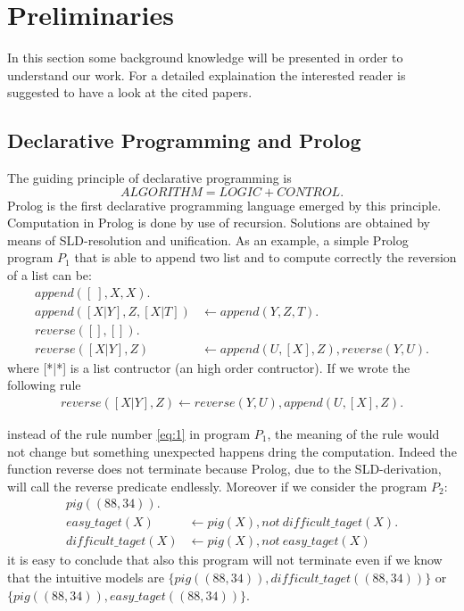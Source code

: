 \usepackage{graphicx}
\section{Preliminaries}
In this section some background knowledge will be presented in order to understand our work. For a detailed explaination the interested reader is suggested to have a look at the cited papers. 
\subsection{Declarative Programming and Prolog}
The guiding principle of declarative programming is 
\[ALGORITHM = LOGIC + CONTROL.\]
Prolog is the first declarative programming language emerged by this principle. Computation in Prolog is done by use of recursion. Solutions are obtained by means of SLD-resolution and unification. As an example, a simple Prolog program \(P_1\) that  is able to append two list and to compute correctly the reversion of a list can be: 
\begin{align}
append ([\:], X, X).& \\
append ([X|Y], Z, [X|T ]) &\leftarrow append (Y, Z, T ). \\
reverse([ ], [ ]).&\\
reverse([X|Y ], Z) &\leftarrow append (U, [X], Z), reverse(Y, U ). \label{eq:1}
\end{align}
where [*|*] is a list contructor (an high order contructor).
If we wrote the following rule 
\begin{align}
reverse([X|Y ], Z) \leftarrow reverse(Y, U ), append(U, [X], Z). \label{eq:2}
\end{align}

instead of the rule number \ref{eq:1} in program \(P_1\), the meaning of the rule would not change but something unexpected happens dring the computation. Indeed the function reverse does not terminate because Prolog, due to the SLD-derivation, will call the reverse predicate endlessly. Moreover if we consider the program  \(P_2\):
\begin{align}
pig((88,34)).& \\
easy\_taget(X) &\leftarrow pig(X), not\: difficult\_taget(X). \\ 
difficult\_taget(X) &\leftarrow pig(X), not\: easy\_taget(X) 
\end{align}
it is easy to conclude that also this program will not terminate even if we know that the intuitive models are \(\{pig((88,34)), difficult\_taget((88,34))\}\) or \\ \(\{pig((88,34)), easy\_taget((88,34))\}\).

